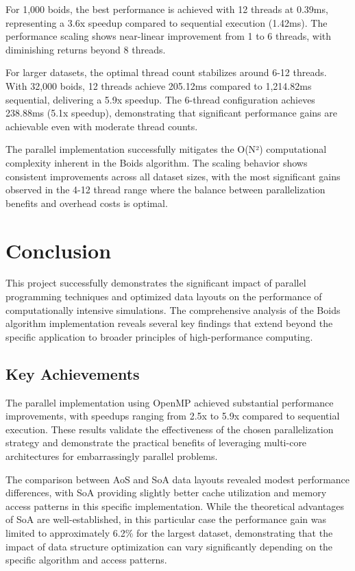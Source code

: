 \documentclass[10pt,twocolumn,letterpaper]{article}
\begin{document}
For 1,000 boids, the best performance is achieved with 12 threads at 0.39ms, representing a 3.6x speedup compared to sequential execution (1.42ms). The performance scaling shows near-linear improvement from 1 to 6 threads, with diminishing returns beyond 8 threads.

For larger datasets, the optimal thread count stabilizes around 6-12 threads. With 32,000 boids, 12 threads achieve 205.12ms compared to 1,214.82ms sequential, delivering a 5.9x speedup. The 6-thread configuration achieves 238.88ms (5.1x speedup), demonstrating that significant performance gains are achievable even with moderate thread counts.

The parallel implementation successfully mitigates the O(N²) computational complexity inherent in the Boids algorithm. The scaling behavior shows consistent improvements across all dataset sizes, with the most significant gains observed in the 4-12 thread range where the balance between parallelization benefits and overhead costs is optimal.

\section{Conclusion}

This project successfully demonstrates the significant impact of parallel programming techniques and optimized data layouts on the performance of computationally intensive simulations. The comprehensive analysis of the Boids algorithm implementation reveals several key findings that extend beyond the specific application to broader principles of high-performance computing.

\subsection{Key Achievements}

The parallel implementation using OpenMP achieved substantial performance improvements, with speedups ranging from 2.5x to 5.9x compared to sequential execution. These results validate the effectiveness of the chosen parallelization strategy and demonstrate the practical benefits of leveraging multi-core architectures for embarrassingly parallel problems.

The comparison between AoS and SoA data layouts revealed modest performance differences, with SoA providing slightly better cache utilization and memory access patterns in this specific implementation. While the theoretical advantages of SoA are well-established, in this particular case the performance gain was limited to approximately 6.2\% for the largest dataset, demonstrating that the impact of data structure optimization can vary significantly depending on the specific algorithm and access patterns.
\end{document}
